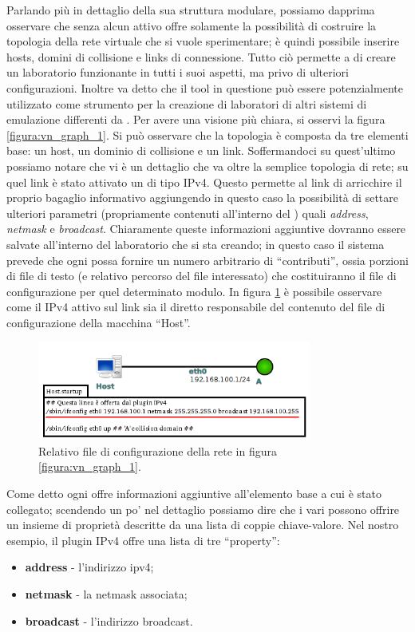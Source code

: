 Parlando più in dettaglio della sua struttura modulare, possiamo dapprima osservare che \visualnetkit{} senza alcun \plugin{} attivo offre solamente la possibilità di costruire la topologia della rete virtuale che si vuole sperimentare; è quindi possibile inserire hosts, domini di collisione e links di connessione. Tutto ciò permette a \visualnetkit{} di creare un laboratorio funzionante in tutti i suoi aspetti, ma privo di ulteriori configurazioni. Inoltre va detto che il tool in questione può essere potenzialmente utilizzato come strumento per la creazione di laboratori di altri sistemi di emulazione differenti da \netkit{}.
Per avere una visione più chiara, si osservi la figura \ref{figura:vn_graph_1}. Si può osservare che la topologia è composta da tre elementi base: un host, un dominio di collisione e un link. Soffermandoci su quest'ultimo possiamo notare che vi è un dettaglio che va oltre la semplice topologia di rete; su quel link è stato attivato un \plugin{} di tipo IPv4. Questo permette al link di arricchire il proprio bagaglio informativo aggiungendo in questo caso la possibilità di settare ulteriori parametri (propriamente contenuti all'interno del \plugin{}) quali \emph{address}, \emph{netmask} e \emph{broadcast}. Chiaramente queste informazioni aggiuntive dovranno essere salvate all'interno del laboratorio che si sta creando; in questo caso il sistema prevede che ogni \plugin{} possa fornire un numero arbitrario di ``contributi'', ossia porzioni di file di testo (e relativo percorso del file interessato) che costituiranno il file di configurazione per quel determinato modulo. In figura \ref{figura:vn_graph_2} è possibile osservare come il \plugin{} IPv4 attivo sul link sia il diretto responsabile del contenuto del file di configurazione della macchina ``Host''.

\begin{figure}[!ht]
	\centering
	\includegraphics[width=9cm]{images/visualnetkit_graph_2.png}
	\caption{Relativo file di configurazione della rete in figura \ref{figura:vn_graph_1}.}
	\label{figura:vn_graph_2}
\end{figure}

Come detto ogni \plugin{} offre informazioni aggiuntive all'elemento base a cui è stato collegato; scendendo un po' nel dettaglio possiamo dire che i vari \plugin{} possono offrire un insieme di proprietà descritte da una lista di coppie chiave-valore. Nel nostro esempio, il plugin IPv4 offre una lista di tre ``property'':
\begin{itemize}
	\item \textbf{address} - l'indirizzo ipv4;
	\item \textbf{netmask} - la netmask associata;
	\item \textbf{broadcast} - l'indirizzo broadcast.
\end{itemize}

